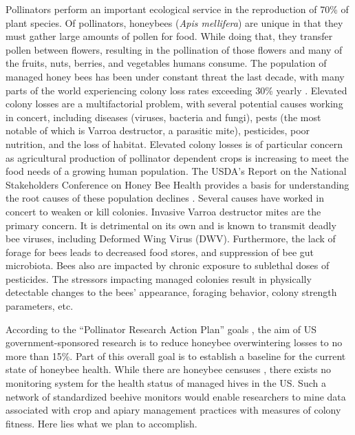 Pollinators perform an important ecological service in the reproduction of 70\% of plant species. Of pollinators, honeybees (\textit{Apis mellifera}) are unique in that they must gather large amounts of pollen for food. While doing that, they transfer pollen between flowers, resulting in the pollination of those flowers and many of the fruits, nuts, berries, and vegetables humans consume.  The population of managed honey bees has been under constant threat the last decade, with many parts of the world experiencing colony loss rates exceeding 30\% yearly \cite{spivak2010plight}. Elevated colony losses are a multifactorial problem, with several potential causes working in concert, including diseases (viruses, bacteria and fungi), pests (the most notable of which is Varroa destructor, a parasitic mite), pesticides, poor nutrition, and the loss of habitat. Elevated colony losses is of particular concern as agricultural production of pollinator dependent crops is increasing to meet the food needs of a growing human population. The USDA's Report on the National Stakeholders Conference on Honey Bee Health provides a basis for understanding the root causes of these population declines \cite{national2012report}. Several causes have worked in concert to weaken or kill colonies. Invasive Varroa destructor mites are the primary concern. It is detrimental on its own and is known to transmit deadly bee viruses, including Deformed Wing Virus (DWV). Furthermore, the lack of forage for bees leads to decreased food stores, and suppression of bee gut microbiota. Bees also are impacted by chronic exposure to sublethal doses of pesticides. The stressors impacting managed colonies result in physically detectable changes to the bees’ appearance, foraging behavior, colony strength parameters, etc.

According to the “Pollinator Research Action Plan” goals \cite{national2015report}, the aim of US government-sponsored research is to reduce honeybee overwintering losses to no more than 15\%. Part of this overall goal is to establish a baseline for the current state of honeybee health. While there are honeybee censuses \cite{vanengelsdorp2011survey}, there exists no monitoring system for the health status of managed hives in the US. Such a network of standardized beehive monitors would enable researchers to mine data associated with crop and apiary management practices with measures of colony fitness. Here lies what we plan to accomplish.

